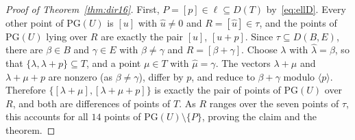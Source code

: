 \documentclass[10pt,a4paper]{amsart}
\newcommand{\PGv}[1]{\mathrm{PG}(#1)}
\newcommand{\la}{\lambda}
\begin{document}
\begin{proof}[Proof of Theorem~\ref{thm:dir16}]
First, $P=[p]\in\ell\subseteq D(T)$ by~\eqref{eq:ellD}.  Every other point of $\PGv U$ is $[u]$ with $\widehat u\neq0$ and $R=[\widehat u]\in\tau$, and the points of $\PGv U$ lying over $R$ are exactly the pair $[u]$, $[u+p]$.  Since $\tau\subseteq D(B,E)$, there are $\beta\in B$ and $\gamma\in E$ with $\beta\neq\gamma$ and $R=[\beta+\gamma]$.  Choose $\la$ with $\widehat\la=\beta$, so that $\{\la,\la+p\}\subseteq T$, and a point $\mu\in T$ with $\widehat\mu=\gamma$.  The vectors $\la+\mu$ and $\la+\mu+p$ are nonzero (as $\beta\neq\gamma$), differ by $p$, and reduce to $\beta+\gamma$ modulo $\langle p\rangle$. Therefore $\{[\la+\mu],[\la+\mu+p]\}$ is exactly the pair of points of $\PGv U$ over $R$, and both are differences of points of $T$.  As $R$ ranges over the seven points of $\tau$, this accounts for all $14$ points of $\PGv U\setminus\{P\}$, proving the claim and the theorem. 
\end{proof}
\end{document}
